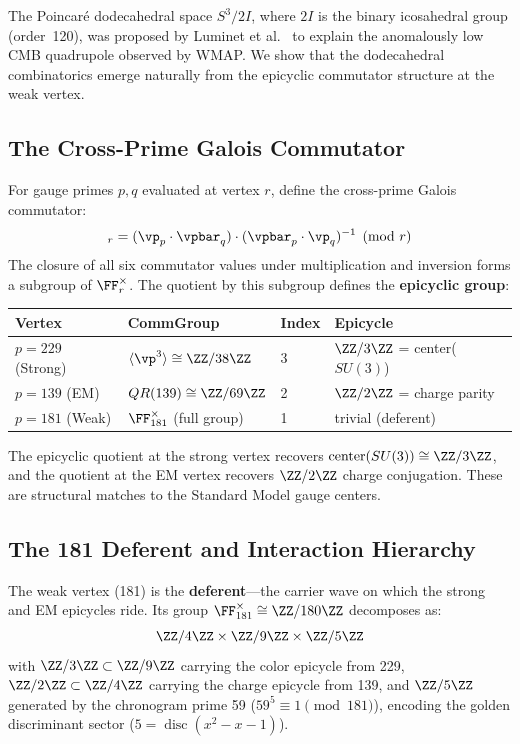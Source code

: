 The Poincar\'{e} dodecahedral space $S^3 / 2I$, where $2I$ is the binary icosahedral group (order~120), was proposed by Luminet et al.~\cite{luminet2003} to explain the anomalously low CMB quadrupole observed by WMAP. We show that the dodecahedral combinatorics emerge naturally from the epicyclic commutator structure at the weak vertex.

\subsection{The Cross-Prime Galois Commutator}

For gauge primes $p, q$ evaluated at vertex $r$, define the cross-prime Galois commutator:
\begin{equation}
    [p,q]_r = (\vp_p \cdot \vpbar_q) \cdot (\vpbar_p \cdot \vp_q)^{-1} \pmod{r}
\end{equation}
The closure of all six commutator values under multiplication and inversion forms a subgroup of $\FF_r^{\times}$. The quotient by this subgroup defines the \textbf{epicyclic group}:

\begin{center}
\begin{tabular}{llll}
\hline
Vertex & CommGroup & Index & Epicycle \\
\hline
$p=229$ (Strong) & $\langle \vp^3 \rangle \cong \ZZ/38\ZZ$ & 3 & $\ZZ/3\ZZ$ = center($SU(3)$) \\
$p=139$ (EM) & $QR(139) \cong \ZZ/69\ZZ$ & 2 & $\ZZ/2\ZZ$ = charge parity \\
$p=181$ (Weak) & $\FF_{181}^{\times}$ (full group) & 1 & trivial (deferent) \\
\hline
\end{tabular}
\end{center}

The epicyclic quotient at the strong vertex recovers $\operatorname{center}(SU(3)) \cong \ZZ/3\ZZ$, and the quotient at the EM vertex recovers $\ZZ/2\ZZ$ charge conjugation. These are structural matches to the Standard Model gauge centers.

\subsection{The 181 Deferent and Interaction Hierarchy}

The weak vertex (181) is the \textbf{deferent}---the carrier wave on which the strong and EM epicycles ride. Its group $\FF_{181}^{\times} \cong \ZZ/180\ZZ$ decomposes as:
\begin{equation}
    \ZZ/4\ZZ \times \ZZ/9\ZZ \times \ZZ/5\ZZ
\end{equation}
with $\ZZ/3\ZZ \subset \ZZ/9\ZZ$ carrying the color epicycle from 229, $\ZZ/2\ZZ \subset \ZZ/4\ZZ$ carrying the charge epicycle from 139, and $\ZZ/5\ZZ$ generated by the chronogram prime 59 ($59^5 \equiv 1 \pmod{181}$), encoding the golden discriminant sector ($5 = \operatorname{disc}(x^2 - x - 1)$).

